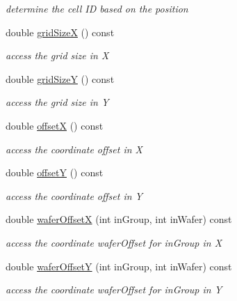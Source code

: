\begin{DoxyCompactItemize}
\begin{DoxyCompactList}\small\item\em determine the cell ID based on the position \end{DoxyCompactList}\item 
double \hyperlink{class_d_d4hep_1_1_d_d_segmentation_1_1_wafer_grid_x_y_ae0f9619846e0e1aac9554fdefad96721}{grid\+SizeX} () const
\begin{DoxyCompactList}\small\item\em access the grid size in X \end{DoxyCompactList}\item 
double \hyperlink{class_d_d4hep_1_1_d_d_segmentation_1_1_wafer_grid_x_y_aae5093c08586a5627d282a2d1bbf99c7}{grid\+SizeY} () const
\begin{DoxyCompactList}\small\item\em access the grid size in Y \end{DoxyCompactList}\item 
double \hyperlink{class_d_d4hep_1_1_d_d_segmentation_1_1_wafer_grid_x_y_a682652a672947e3ddbd1131ade5c79aa}{offsetX} () const
\begin{DoxyCompactList}\small\item\em access the coordinate offset in X \end{DoxyCompactList}\item 
double \hyperlink{class_d_d4hep_1_1_d_d_segmentation_1_1_wafer_grid_x_y_aae837386dda1864f17744d167a423feb}{offsetY} () const
\begin{DoxyCompactList}\small\item\em access the coordinate offset in Y \end{DoxyCompactList}\item 
double \hyperlink{class_d_d4hep_1_1_d_d_segmentation_1_1_wafer_grid_x_y_ab616e7d7aa7ba612425194875aab11bb}{wafer\+OffsetX} (int in\+Group, int in\+Wafer) const
\begin{DoxyCompactList}\small\item\em access the coordinate wafer\+Offset for in\+Group in X \end{DoxyCompactList}\item 
double \hyperlink{class_d_d4hep_1_1_d_d_segmentation_1_1_wafer_grid_x_y_ad6f8071dae67ae2f13081f9d1c2462d7}{wafer\+OffsetY} (int in\+Group, int in\+Wafer) const
\begin{DoxyCompactList}\small\item\em access the coordinate wafer\+Offset for in\+Group in Y \end{DoxyCompactList}\item 

\end{DoxyCompactItemize}
